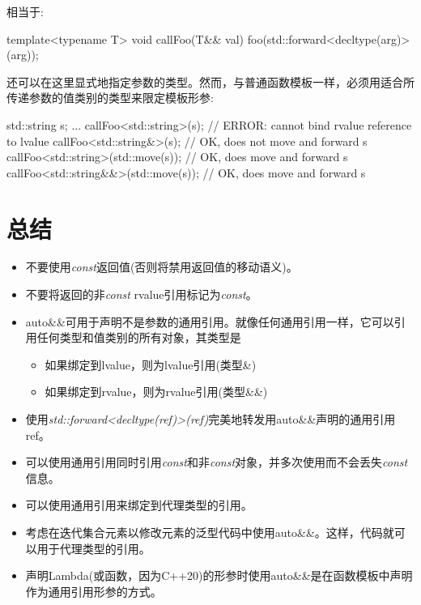 相当于:\par

\begin{codebox}[cpp]
template<typename T>
void callFoo(T&& val) {
  foo(std::forward<decltype(arg)>(arg));
}
\end{codebox}

还可以在这里显式地指定参数的类型。然而，与普通函数模板一样，必须用适合所传递参数的值类别的类型来限定模板形参:\par

\begin{codebox}[cpp]
std::string s;
...
callFoo<std::string>(s); // ERROR: cannot bind rvalue reference to lvalue
callFoo<std::string&>(s); // OK, does not move and forward s
callFoo<std::string>(std::move(s)); // OK, does move and forward s
callFoo<std::string&&>(std::move(s)); // OK, does move and forward s
\end{codebox}


\section{总结}

\begin{itemize}
  \item 不要使用\textit{const}返回值(否则将禁用返回值的移动语义)。
  \item 不要将返回的非\textit{const} rvalue引用标记为\textit{const}。
  \item auto\&\&可用于声明不是参数的通用引用。就像任何通用引用一样，它可以引用任何类型和值类别的所有对象，其类型是
  \begin{itemize}
    \item[-] 如果绑定到lvalue，则为lvalue引用(类型\&)
    \item[-] 如果绑定到rvalue，则为rvalue引用(类型\&\&)
  \end{itemize}
  \item 使用\textit{std::\allowbreak{}forward<\allowbreak{}decltype(\allowbreak{}ref)\allowbreak{}>(\allowbreak{}ref)\allowbreak{}}完美地转发用auto\&\&声明的通用引用ref。
  \item 可以使用通用引用同时引用\textit{const}和非\textit{const}对象，并多次使用而不会丢失\textit{const}信息。
  \item 可以使用通用引用来绑定到代理类型的引用。
  \item 考虑在迭代集合元素以修改元素的泛型代码中使用auto\&\&。这样，代码就可以用于代理类型的引用。
  \item 声明Lambda(或函数，因为C++20)的形参时使用auto\&\&是在函数模板中声明作为通用引用形参的方式。
\end{itemize}
